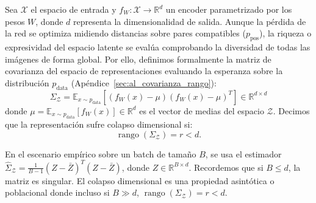 \begin{definition}
Sea $\mathcal{X}$ el espacio de entrada y $f_W: \mathcal{X} \to \mathbb{R}^d$ un encoder parametrizado por los pesos $W$, donde $d$ representa la dimensionalidad de salida. Aunque la pérdida de la red se optimiza midiendo distancias sobre pares compatibles ($p_{\text{pos}}$), la riqueza o expresividad del espacio latente se evalúa comprobando la diversidad de todas las imágenes de forma global. Por ello, definimos formalmente la matriz de covarianza del espacio de representaciones evaluando la esperanza sobre la distribución $p_{\text{data}}$ (Apéndice~\ref{sec:al_covarianza_rango}):
\begin{equation}
    \Sigma_\mathcal{Z} = \mathbb{E}_{x \sim p_{\text{data}}}\left[(f_W(x) - \mu)(f_W(x) - \mu)^T\right] \in \mathbb{R}^{d \times d}
\end{equation}
donde $\mu = \mathbb{E}_{x \sim p_{\text{data}}}[f_W(x)] \in \mathbb{R}^d$ es el vector de medias del espacio $\mathcal{Z}$. Decimos que la representación sufre colapso dimensional si:
\begin{equation}
    \operatorname{rango}(\Sigma_\mathcal{Z}) = r < d.
\end{equation}
\end{definition}

\begin{remark}
En el escenario empírico sobre un batch de tamaño $B$, se usa el estimador $\hat{\Sigma}_\mathcal{Z} = \frac{1}{B-1}(Z - \bar{Z})^T(Z - \bar{Z})$, donde $Z \in \mathbb{R}^{B \times d}$. Recordemos que si $B \le d$, la matriz es singular. El colapso dimensional es una propiedad asintótica o poblacional donde incluso si $B \gg d$, $\operatorname{rango}(\Sigma_\mathcal{Z}) = r < d$.
\end{remark}

